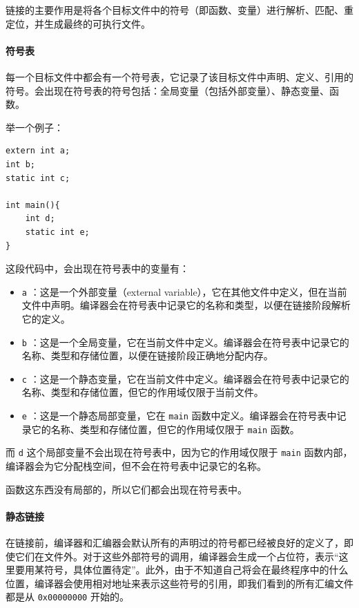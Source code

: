 链接的主要作用是将各个目标文件中的符号（即函数、变量）进行解析、匹配、重定位，并生成最终的可执行文件。

\paragraph{符号表} 每一个目标文件中都会有一个符号表，它记录了该目标文件中声明、定义、引用的符号。会出现在符号表的符号包括：全局变量（包括外部变量）、静态变量、函数。

举一个例子：
\begin{verbatim}
extern int a;
int b; 
static int c;

int main(){
    int d;
    static int e;
}
\end{verbatim}
这段代码中，会出现在符号表中的变量有：
\begin{itemize}
    \item \verb|a| ：这是一个外部变量（external variable），它在其他文件中定义，但在当前文件中声明。编译器会在符号表中记录它的名称和类型，以便在链接阶段解析它的定义。
    \item \verb|b| ：这是一个全局变量，它在当前文件中定义。编译器会在符号表中记录它的名称、类型和存储位置，以便在链接阶段正确地分配内存。
    \item \verb|c| ：这是一个静态变量，它在当前文件中定义。编译器会在符号表中记录它的名称、类型和存储位置，但它的作用域仅限于当前文件。
    \item \verb|e| ：这是一个静态局部变量，它在 \verb|main| 函数中定义。编译器会在符号表中记录它的名称、类型和存储位置，但它的作用域仅限于 \verb|main| 函数。
\end{itemize}
而 \verb|d| 这个局部变量不会出现在符号表中，因为它的作用域仅限于 \verb|main| 函数内部，编译器会为它分配栈空间，但不会在符号表中记录它的名称。

函数这东西没有局部的，所以它们都会出现在符号表中。

\paragraph{静态链接}

在链接前，编译器和汇编器会默认所有的声明过的符号都已经被良好的定义了，即使它们在文件外。对于这些外部符号的调用，编译器会生成一个占位符，表示“这里要用某符号，具体位置待定”。此外，由于不知道自己将会在最终程序中的什么位置，编译器会使用相对地址来表示这些符号的引用，即我们看到的所有汇编文件都是从 \verb|0x00000000| 开始的。


